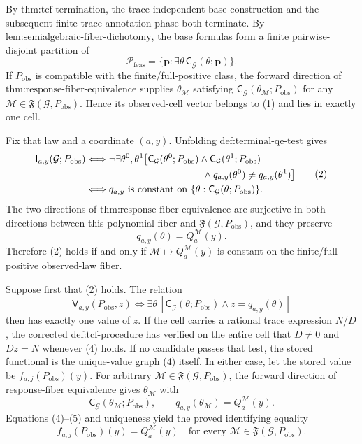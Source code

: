 By \(\text{thm:tcf-termination}\), the trace-independent base construction and the subsequent finite trace-annotation phase both terminate. By \(\text{lem:semialgebraic-fiber-dichotomy}\), the base formulas form a finite pairwise-disjoint partition of
\[
\mathcal P_{\mathrm{feas}}
=\{\mathbf p:\exists\theta\,\mathsf C_{\mathcal G}(\theta;\mathbf p)\}.
\tag{1}
\]
If \(P_{\mathrm{obs}}\) is compatible with the finite/full-positive class, the forward direction of \(\text{thm:response-fiber-equivalence}\) supplies \(\theta_{\mathcal M}\) satisfying \(\mathsf C_{\mathcal G}(\theta_{\mathcal M};P_{\mathrm{obs}})\) for any \(\mathcal M\in\mathfrak F(\mathcal G,P_{\mathrm{obs}})\). Hence its observed-cell vector belongs to (1) and lies in exactly one cell.

Fix that law and a coordinate \((a,y)\). Unfolding \(\text{def:terminal-qe-test}\) gives
\[
\begin{aligned}
\mathsf I_{a,y}(\mathcal G;P_{\mathrm{obs}})
&\Longleftrightarrow
\neg\exists\theta^0,\theta^1\bigl[
\mathsf C_{\mathcal G}(\theta^0;P_{\mathrm{obs}})
\wedge\mathsf C_{\mathcal G}(\theta^1;P_{\mathrm{obs}})\\
&\hspace{42mm}\wedge q_{a,y}(\theta^0)\neq q_{a,y}(\theta^1)
\bigr]\\
&\Longleftrightarrow q_{a,y}\text{ is constant on }
\{\theta:\mathsf C_{\mathcal G}(\theta;P_{\mathrm{obs}})\}.
\end{aligned}
\tag{2}
\]
The two directions of \(\text{thm:response-fiber-equivalence}\) are surjective in both directions between this polynomial fiber and \(\mathfrak F(\mathcal G,P_{\mathrm{obs}})\), and they preserve
\[
q_{a,y}(\theta)=Q_a^{\mathcal M}(y).
\tag{3}
\]
Therefore (2) holds if and only if \(\mathcal M\mapsto Q_a^{\mathcal M}(y)\) is constant on the finite/full-positive observed-law fiber.

Suppose first that (2) holds. The relation
\[
\mathsf V_{a,y}(P_{\mathrm{obs}},z)
\Longleftrightarrow
\exists\theta\,[\mathsf C_{\mathcal G}(\theta;P_{\mathrm{obs}})\wedge z=q_{a,y}(\theta)]
\tag{4}
\]
then has exactly one value of \(z\). If the cell carries a rational trace expression \(N/D\), the corrected \(\text{def:tcf-procedure}\) has verified on the entire cell that \(D\neq0\) and \(Dz=N\) whenever (4) holds. If no candidate passes that test, the stored functional is the unique-value graph (4) itself. In either case, let the stored value be \(f_{a,j}(P_{\mathrm{obs}})(y)\). For arbitrary \(\mathcal M\in\mathfrak F(\mathcal G,P_{\mathrm{obs}})\), the forward direction of response-fiber equivalence gives \(\theta_{\mathcal M}\) with
\[
\mathsf C_{\mathcal G}(\theta_{\mathcal M};P_{\mathrm{obs}}),
\qquad
q_{a,y}(\theta_{\mathcal M})=Q_a^{\mathcal M}(y).
\tag{5}
\]
Equations (4)--(5) and uniqueness yield the proved identifying equality
\[
f_{a,j}(P_{\mathrm{obs}})(y)=Q_a^{\mathcal M}(y)
\quad\text{for every }\mathcal M\in\mathfrak F(\mathcal G,P_{\mathrm{obs}}).
\tag{6}
\]

